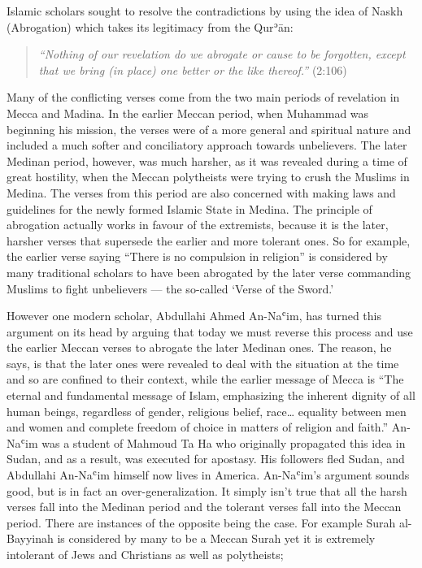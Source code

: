 \documentclass[12pt]{memoir}
\def\´{ʾ} %
\def\`{ʿ} %
\def \Quran{Qur\-\´ān} %
\def\–{-\hskip0pt}
\newcommand{\QRef}[1]{{\color{darkblue}#1}}
\begin{document}
Islamic scholars sought to resolve the contradictions by using the idea
of Naskh (Abrogation) which takes its legitimacy from the \Quran:

\begin{quote}
\emph{“Nothing of our revelation do we abrogate or cause to be forgotten,
except that we bring (in place) one better or the like thereof.”}
(\QRef{2:106})
\end{quote}

Many of the conflicting verses come from the two main periods
of revelation in Mecca and Madina.
In the earlier Meccan period, when Muhammad was beginning his mission,
the verses were of a more general and spiritual nature and included
a much softer and conciliatory approach towards unbelievers.
The later Medinan period, however, was much harsher,
as it was revealed during a time of great hostility,
when the Meccan polytheists were trying to crush the Muslims in Medina.
The verses from this period are also concerned with making laws
and guidelines for the newly formed Islamic State in Medina.
The principle of abrogation actually works in favour of the extremists,
because it is the later, harsher verses
that supersede the earlier and more tolerant ones.
So for example, the earlier verse saying “There is no compulsion in religion”
is considered by many traditional scholars to have been abrogated
by the later verse commanding Muslims to fight unbelievers —
the so\–called ‘Verse of the Sword.’

However one modern scholar, Abdullahi Ahmed An\–Na\`im,
has turned this argument on its head by arguing
that today we must reverse this process
and use the earlier Meccan verses to abrogate the later Medinan ones.
The reason, he says, is that the later ones were revealed to deal
with the situation at the time and so are confined to their context,
while the earlier message of Mecca is
“The eternal and fundamental message of Islam,
emphasizing the inherent dignity of all human beings,
regardless of gender, religious belief, race…
equality between men and women and complete freedom of choice
in matters of religion and faith.”
An\–Na\`im was a student of Mahmoud Ta Ha who originally propagated this idea
in Sudan, and as a result, was executed for apostasy.
His followers fled Sudan, and Abdullahi An\–Na\`im himself
now lives in America.
An\–Na\`im’s argument sounds good, but is in fact an over\–generalization.
It simply isn’t true that all the harsh verses fall into the Medinan period
and the tolerant verses fall into the Meccan period.
There are instances of the opposite being the case.
For example Surah al\–Bayyinah is considered by many to be a Meccan Surah
yet it is extremely intolerant of Jews and Christians as well as polytheists;
\end{document}
